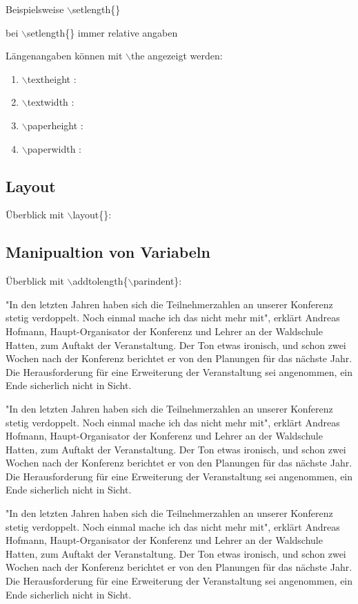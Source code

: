 Beispielsweise $\backslash$setlength\{\}

bei $\backslash$setlength\{\} immer relative angaben

Längenangaben können mit $\backslash$the angezeigt werden:
\begin{enumerate}
	\item
	$\backslash$textheight : \the \textheight
	\item
	$\backslash$textwidth : \the \textwidth
	\item
	$\backslash$paperheight : \the \paperheight
	\item
	$\backslash$paperwidth : \the \paperwidth
\end{enumerate}

\subsection{Layout}
Überblick mit $\backslash$layout\{\}:





\subsection{Manipualtion von Variabeln}
Überblick mit $\backslash$addtolength\{$\backslash$parindent\}:

\addtolength{\parindent}{1pt}
"In den letzten Jahren haben sich die Teilnehmerzahlen an unserer Konferenz stetig verdoppelt. Noch
einmal mache ich das nicht mehr mit", erklärt Andreas Hofmann, Haupt-Organisator der Konferenz und
Lehrer an der Waldschule Hatten, zum Auftakt der Veranstaltung. Der Ton etwas ironisch, und schon
zwei Wochen nach der Konferenz berichtet er von den Planungen für das nächste Jahr. Die
Herausforderung für eine Erweiterung der Veranstaltung sei angenommen, ein Ende sicherlich nicht in
Sicht.

\addtolength{\parindent}{1mm}
"In den letzten Jahren haben sich die Teilnehmerzahlen an unserer Konferenz stetig verdoppelt. Noch
einmal mache ich das nicht mehr mit", erklärt Andreas Hofmann, Haupt-Organisator der Konferenz und
Lehrer an der Waldschule Hatten, zum Auftakt der Veranstaltung. Der Ton etwas ironisch, und schon
zwei Wochen nach der Konferenz berichtet er von den Planungen für das nächste Jahr. Die
Herausforderung für eine Erweiterung der Veranstaltung sei angenommen, ein Ende sicherlich nicht in
Sicht.

\addtolength{\parindent}{1cm}
"In den letzten Jahren haben sich die Teilnehmerzahlen an unserer Konferenz stetig verdoppelt. Noch
einmal mache ich das nicht mehr mit", erklärt Andreas Hofmann, Haupt-Organisator der Konferenz und
Lehrer an der Waldschule Hatten, zum Auftakt der Veranstaltung. Der Ton etwas ironisch, und schon
zwei Wochen nach der Konferenz berichtet er von den Planungen für das nächste Jahr. Die
Herausforderung für eine Erweiterung der Veranstaltung sei angenommen, ein Ende sicherlich nicht in
Sicht.

